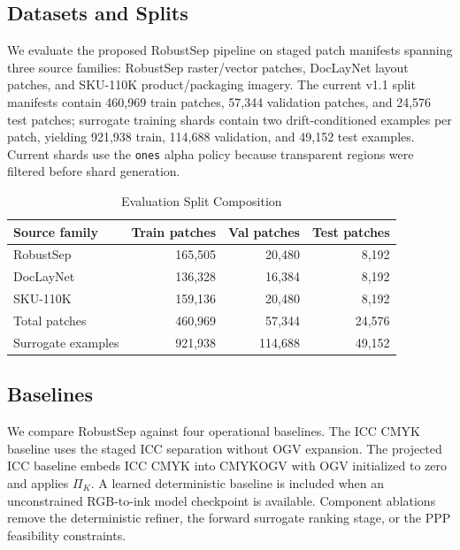 \documentclass[11pt]{article}
\begin{document}
\subsection{Datasets and Splits}

\begin{sloppypar}
We evaluate the proposed RobustSep pipeline on staged patch manifests spanning three source families: RobustSep raster/vector patches, DocLayNet layout patches, and SKU-110K product/packaging imagery. The current v1.1 split manifests contain 460,969 train patches, 57,344 validation patches, and 24,576 test patches; surrogate training shards contain two drift-conditioned examples per patch, yielding 921,938 train, 114,688 validation, and 49,152 test examples. Current shards use the \texttt{ones} alpha policy because transparent regions were filtered before shard generation.
\end{sloppypar}

\begin{table}[htbp]
\centering
\caption{Evaluation Split Composition}
\label{tab:dataset_splits}
\begin{tabular}{lrrr}
\toprule
Source family & Train patches & Val patches & Test patches \\
\midrule
RobustSep & 165,505 & 20,480 & 8,192 \\
DocLayNet & 136,328 & 16,384 & 8,192 \\
SKU-110K & 159,136 & 20,480 & 8,192 \\
\midrule
Total patches & 460,969 & 57,344 & 24,576 \\
Surrogate examples & 921,938 & 114,688 & 49,152 \\
\bottomrule
\end{tabular}
\end{table}

\subsection{Baselines}

We compare RobustSep against four operational baselines. The ICC CMYK baseline uses the staged ICC separation without OGV expansion. The projected ICC baseline embeds ICC CMYK into CMYKOGV with OGV initialized to zero and applies $\Pi_K$. A learned deterministic baseline is included when an unconstrained RGB-to-ink model checkpoint is available. Component ablations remove the deterministic refiner, the forward surrogate ranking stage, or the PPP feasibility constraints.
\end{document}
